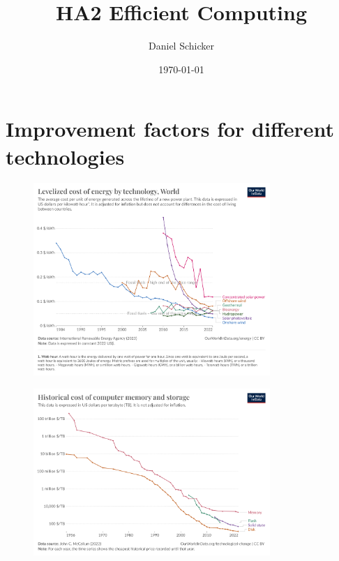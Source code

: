 \documentclass{article}
\begin{document}
\title{HA2 Efficient Computing}
\author{Daniel Schicker}
\date{\today}

\maketitle
\section{Improvement factors for different technologies}

\begin{figure}[h]
    \includegraphics[width=0.8\textwidth]{levelized_cost_of_energy.png}
\end{figure}

\begin{figure}[H]
    \includegraphics[width=0.8\textwidth]{historical-cost-of-computer-memory-and-storage.png}
\end{figure}
\end{document}
